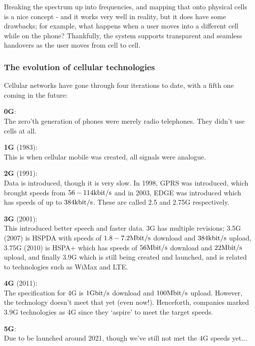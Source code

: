 Breaking the spectrum up into frequencies, and mapping that onto physical cells
is a nice concept - and it works very well in reality, but it does have some
drawbacks; for example, what happens when a user moves into a different cell
while on the phone? Thankfully, the system supports transparent and seamless
handovers as the user moves from cell to cell.

\subsubsection{The evolution of cellular technologies}

Cellular networks have gone through four iterations to date, with a fifth one
coming in the future:

\begin{description}
  \item \textbf{0G}:\\
  	The zero'th generation of phones were merely radio telephones. They didn't
  	use cells at all.
  \item \textbf{1G} (1983):\\
  	This is when cellular mobile was created, all signals were analogue.
  \item \textbf{2G} (1991):\\
  	Data is introduced, though it is very slow. In 1998, GPRS was introduced,
  	which brought speeds from $56-114\si{\kilo\bit\per\second}$ and in 2003,
  	EDGE was introduced which has speeds of up to
  	$384\si{\kilo\bit\per\second}$. These are called 2.5 and 2.75G respectively.
  \item \textbf{3G} (2001):\\
  	This introduced better speech and faster data. 3G has multiple revisions; 
  	3.5G (2007) is HSPDA with speeds of $1.8-7.2\si{\mega\bit\per\second}$
  	download and $384\si{\kilo\bit\per\second}$ upload, 3.75G (2010) is HSPA+
  	which has speeds of $56\si{\mega\bit\per\second}$ download and 
  	$22\si{\mega\bit\per\second}$ upload, and finally 3.9G which is still being
  	created and launched, and is related to technologies such as WiMax and LTE.
  \item \textbf{4G} (2011):\\
  	The specification for 4G is $1\si{\giga\bit\per\second}$ download and 
  	$100\si{\mega\bit\per\second}$ upload. However, the technology doesn't meet
  	that yet (even now!). Henceforth, companies marked 3.9G technologies as 4G
  	since they `aspire' to meet the target speeds.
  \item \textbf{5G}:\\
  	Due to be launched around 2021, though we've still not met the 4G speeds
  	yet...
\end{description}

